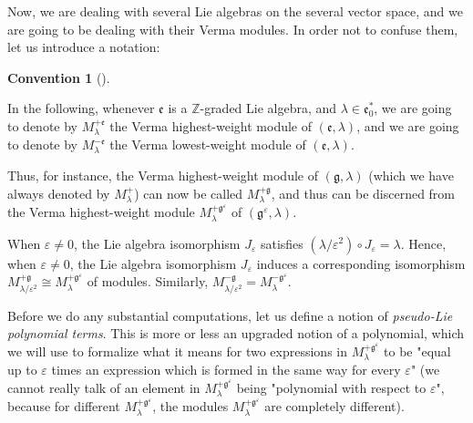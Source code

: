 \documentclass
[numbers=enddot,12pt,final,onecolumn,german,notitlepage]{scrartcl}%
\theoremstyle{definition}
\newtheorem{conv}[theo]{Convention}
\newenvironment{Convention}[1][]
{\begin{conv}[#1]\begin{leftbar}}
{\end{leftbar}\end{conv}}
\begin{document}
Now, we are dealing with several Lie algebras on the several vector space, and
we are going to be dealing with their Verma modules. In order not to confuse
them, let us introduce a notation:

\begin{Convention}
In the following, whenever $\mathfrak{e}$ is a $\mathbb{Z}$-graded Lie
algebra, and $\lambda\in\mathfrak{e}_{0}^{\ast}$, we are going to denote by
$M_{\lambda}^{+\mathfrak{e}}$ the Verma highest-weight module of $\left(
\mathfrak{e},\lambda\right)  $, and we are going to denote by $M_{\lambda
}^{-\mathfrak{e}}$ the Verma lowest-weight module of $\left(  \mathfrak{e}%
,\lambda\right)  $.
\end{Convention}

Thus, for instance, the Verma highest-weight module of $\left(  \mathfrak{g}%
,\lambda\right)  $ (which we have always denoted by $M_{\lambda}^{+}$) can now
be called $M_{\lambda}^{+\mathfrak{g}}$, and thus can be discerned from the
Verma highest-weight module $M_{\lambda}^{+\mathfrak{g}^{\varepsilon}}$ of
$\left(  \mathfrak{g}^{\varepsilon},\lambda\right)  $.

When $\varepsilon\neq0$, the Lie algebra isomorphism $J_{\varepsilon}$
satisfies $\left(  \lambda/\varepsilon^{2}\right)  \circ J_{\varepsilon
}=\lambda$. Hence, when $\varepsilon\neq0$, the Lie algebra isomorphism
$J_{\varepsilon}$ induces a corresponding isomorphism $M_{\lambda
/\varepsilon^{2}}^{+\mathfrak{g}}\cong M_{\lambda}^{+\mathfrak{g}%
^{\varepsilon}}$ of modules. Similarly, $M_{\lambda/\varepsilon^{2}%
}^{-\mathfrak{g}}=M_{\lambda}^{-\mathfrak{g}^{\varepsilon}}$.

Before we do any substantial computations, let us define a notion of
\textit{pseudo-Lie polynomial terms}. This is more or less an upgraded notion
of a polynomial, which we will use to formalize what it means for two
expressions in $M_{\lambda}^{+\mathfrak{g}^{\varepsilon}}$ to be "equal up to
$\varepsilon$ times an expression which is formed in the same way for every
$\varepsilon$" (we cannot really talk of an element in $M_{\lambda
}^{+\mathfrak{g}^{\varepsilon}}$ being "polynomial with respect to
$\varepsilon$", because for different $M_{\lambda}^{+\mathfrak{g}%
^{\varepsilon}}$, the modules $M_{\lambda}^{+\mathfrak{g}^{\varepsilon}}$ are
completely different).
\end{document}
